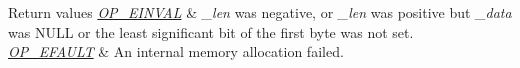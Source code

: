 \begin{DoxyRetVals}{Return values}
{\em \hyperlink{group__error__codes_gae0879acafe9cc0ab72462d291fdb6fb6}{O\+P\+\_\+\+E\+I\+N\+V\+AL}} & {\itshape \+\_\+len} was negative, or {\itshape \+\_\+len} was positive but {\itshape \+\_\+data} was {\ttfamily N\+U\+LL} or the least significant bit of the first byte was not set. \\
\hline
{\em \hyperlink{group__error__codes_ga2ddb887c0bb55c74ea6be391fabcba59}{O\+P\+\_\+\+E\+F\+A\+U\+LT}} & An internal memory allocation failed. \\
\hline
\end{DoxyRetVals}
